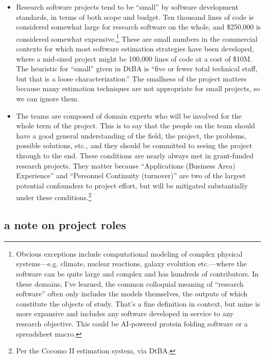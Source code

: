 \documentclass[12pt,oneside]{book}
\begin{document}
\begin{itemize}[wide, labelwidth=!, labelindent=0pt, font=\bfseries]
\item Research software projects tend to be ``small'' by software development standards, in terms of both scope and budget. Ten thousand lines of code is considered somewhat large for research software on the whole, and \$250,000 is considered somewhat expensive.\footnote{Obvious exceptions include computational modeling of complex physical systems---e.g. climate, nuclear reactions, galaxy evolution etc.---where the software can be quite large and complex and has hundreds of contributors. In these domains, I've learned, the common colloquial meaning of ``research software'' often only includes the models themselves, the outputs of which constitute the objects of study. That's a fine definition in context, but mine is more expansive and includes any software developed in service to any research objective. This could be AI-powered protein folding software or a spreadsheet macro.} These are small numbers in the commercial contexts for which most software estimation strategies have been developed, where a mid-sized project might be 100,000 lines of code at a cost of \$10M. The heuristic for ``small'' given in DtBA is ``five or fewer total technical staff, but that is a loose characterization.'' The smallness of the project matters because many estimation techniques are not appropriate for small projects, so we can ignore them.
\item The teams are composed of domain experts who will be involved for the whole term of the project. This is to say that the people on the team should have a good general understanding of the field, the project, the problems, possible solutions, etc., and they should be committed to seeing the project through to the end. These conditions are nearly always met in grant-funded research projects. They matter because ``Applications (Business Area) Experience'' and ``Personnel Continuity (turnover)'' are two of the largest potential confounders to project effort, but will be mitigated substantially under these conditions.\footnote{Per the Cocomo II estimation system, via DtBA.}
\end{itemize}

\newpage
\subsection*{a note on project roles}
\label{scrivauto:12}
\end{document}
